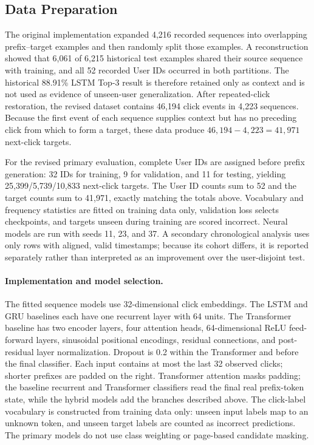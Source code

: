 \documentclass[sn-mathphys-num, Numbered]{sn-jnl}%
\theoremstyle{thmstyleone}%
\theoremstyle{thmstyletwo}%
\theoremstyle{thmstylethree}%
\providecommand{\DIFadd}[1]{{\protect\color{green!40!black}#1}} %
\providecommand{\DIFaddbegin}{} %
\newcommand{\DIFaddincludegraphics}[2][]{{\color{blue}\fbox{\DIFOincludegraphics[#1]{#2}}}} %
\DeclareRobustCommand{\DIFaddbegin}{\DIFOaddbegin \let\includegraphics\DIFaddincludegraphics} %
\begin{document}
\DIFaddbegin \subsection{\DIFadd{Data Preparation}}
\DIFadd{The original implementation expanded 4,216 recorded sequences into overlapping prefix--target examples and then randomly split those examples. A reconstruction showed that 6,061 of 6,215 historical test examples shared their source sequence with training, and all 52 recorded User IDs occurred in both partitions. The historical 88.91\% LSTM Top-3 result is therefore retained only as context and is not used as evidence of unseen-user generalization. After repeated-click restoration, the revised dataset contains 46,194 click events in 4,223 sequences. Because the first event of each sequence supplies context but has no preceding click from which to form a target, these data produce $46{,}194-4{,}223=41{,}971$ next-click targets.
}

\DIFadd{For the revised primary evaluation, complete User IDs are assigned before prefix generation: 32 IDs for training, 9 for validation, and 11 for testing, yielding 25,399/5,739/10,833 next-click targets. The User ID counts sum to 52 and the target counts sum to 41,971, exactly matching the totals above. Vocabulary and frequency statistics are fitted on training data only, validation loss selects checkpoints, and targets unseen during training are scored incorrect. Neural models are run with seeds 11, 23, and 37. A secondary chronological analysis uses only rows with aligned, valid timestamps; because its cohort differs, it is reported separately rather than interpreted as an improvement over the user-disjoint test.
}

\paragraph{\DIFadd{Implementation and model selection.}} \DIFadd{The fitted sequence models use 32-dimensional click embeddings. The LSTM and GRU baselines each have one recurrent layer with 64 units. The Transformer baseline has two encoder layers, four attention heads, 64-dimensional ReLU feed-forward layers, sinusoidal positional encodings, residual connections, and post-residual layer normalization. Dropout is 0.2 within the Transformer and before the final classifier. Each input contains at most the last 32 observed clicks; shorter prefixes are padded on the right. Transformer attention masks padding; the baseline recurrent and Transformer classifiers read the final real prefix-token state, while the hybrid models add the branches described above. The click-label vocabulary is constructed from training data only: unseen input labels map to an unknown token, and unseen target labels are counted as incorrect predictions. The primary models do not use class weighting or page-based candidate masking.}
\end{document}

